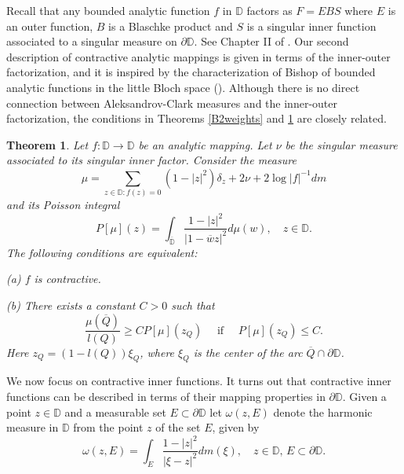 \documentclass[a4paper,12pt]{article}
\newtheorem{theorem}{Theorem}[section]
\theoremstyle{definition}
\numberwithin{equation}{section}
\newcommand{\D}{\mathbb D}
\begin{document}
\vspace{0.2cm}

Recall that any bounded analytic function  $f$ in $\D$ factors as $F=EBS$ where $E$ is an outer function, $B$ is a Blaschke product and $S$ is a singular inner function associated to a singular measure on $\partial \D$. See Chapter II of \cite{garnett}. Our second description of contractive analytic mappings is given in terms of the inner-outer factorization, and it is inspired by the characterization of Bishop of bounded analytic functions in the little Bloch space (\cite{Bi}). Although there is no direct connection between Aleksandrov-Clark measures and the inner-outer factorization, the conditions in Theorems \ref{B2weights} and \ref{Zeros} are closely related. 

\begin{theorem}
    \label{Zeros}
    Let $f: \mathbb{D} \rightarrow \mathbb{D}$ be an analytic mapping. Let $\nu$ be the singular measure associated to its singular inner factor. Consider the measure
    $$
    \mu = \sum_{z \in \mathbb{D} : f(z)=0} (1-|z|^2) \delta_{z} + 2 \nu + 2 \log |f|^{-1} dm  
    $$
and its Poisson integral 
$$
P[\mu] (z) = \int_{\overline{\D}} \frac{1-|z|^2}{|1 - \overline{w} z |^2} d \mu (w), \quad z \in \D .
$$
The following conditions are equivalent: 

(a) $f$ is contractive.

(b) There exists a constant $C >0$ such that
$$
\frac{\mu (\overline{Q})}{l (Q)} \geq C P[\mu] (z_Q) \quad \text{ if } \quad P[\mu] (z_Q) \leq  C. 
$$
Here $z_Q = (1- l(Q)) \xi_Q$, where $\xi_Q$ is the center of the arc $\overline{Q} \cap \partial \D$. 
\end{theorem}

\vspace{0.2cm}

We now focus on contractive inner functions. It turns out that contractive inner functions can be described in terms of their mapping properties in $\partial \D$. Given a point $z \in \D$ and a measurable set $E \subset \partial \D$ let $\omega (z, E)$ denote the harmonic measure in $\D$ from the point $z$ of the set $E$, given by
\begin{equation}
    \label{harmonicmeasure}
    \omega(z, E)=\int_{E} \frac{1-|z|^{2}}{|\xi-z|^{2}} d m(\xi), \quad z \in \mathbb{D}, \, E \subset \partial \D .
\end{equation}
\end{document}
